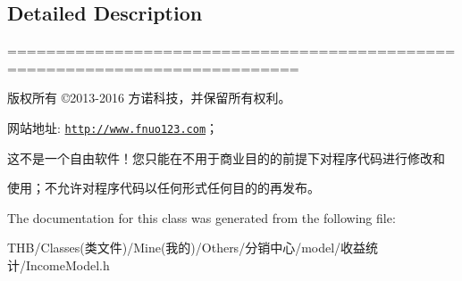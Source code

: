 \subsection{Detailed Description}
============================================================================

版权所有 ©2013-\/2016 方诺科技，并保留所有权利。

网站地址\+: \href{http://www.fnuo123.com}{\tt http\+://www.\+fnuo123.\+com}； 



这不是一个自由软件！您只能在不用于商业目的的前提下对程序代码进行修改和

使用；不允许对程序代码以任何形式任何目的的再发布。 

 

The documentation for this class was generated from the following file\+:\begin{DoxyCompactItemize}
\item 
T\+H\+B/\+Classes(类文件)/\+Mine(我的)/\+Others/分销中心/model/收益统计/Income\+Model.\+h\end{DoxyCompactItemize}
